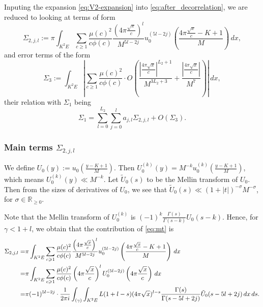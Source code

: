 \documentclass[reqno, 12pt]{amsart}
\renewcommand{\geq}{\geqslant}
\begin{document}
Inputing the expansion \eqref{eq:V2-expansion} into \eqref{eq:after_decorrelation}, we {are reduced to looking} at terms of form
\begin{equation}
\label{eq:mt}
\Sigma_{2,j,l} := \pi \int_{K^2E} \sum_{c \geq 1} \frac{\mu(c)^2}{c\phi(c)} \frac{\left(4\pi \frac{\sqrt{x}}{c} \right)^l}{M^{5l-2j}} u_0^{(5l-2j)} \left( \frac{4\pi \frac{\sqrt{x}}{c}-K+1}{M} \right) \,dx,
\end{equation}
and error terms of the form
\begin{equation}
\label{eq:et}
\Sigma_{3} := \int_{K^2E} \left| \sum_{c \geq 1} \frac{\mu(c)^2}{c\phi(c)} \cdot O \left( \frac{|\frac{4\pi \sqrt{x}}{c}|^{L_2+1}}{M^{3L_2+3}} + \frac{|\frac{4\pi \sqrt{x}}{c}|}{M^7} \right)  \right| \,dx,
\end{equation}
their relation with $\Sigma_1$ being
\[ \Sigma_1 = \sum_{l=0}^{L_2} \sum_{j=0}^l a_{j,l} \Sigma_{2,j,l} + O(\Sigma_3). \]


\subsubsection{Main terms {$\Sigma_{2,j,l}$}}

{W}e define $U_0(y) := u_0 \left( \frac{y-K+1}{M} \right)$. Then $U_0^{(k)}(y) = M^{-k} u_0^{(k)} \left( \frac{y-K+1}{M} \right)$, which means $U_0^{(k)}(y) \ll M^{-k}$.
Let $\tilde{U}_0(s)$ to be the Mellin transform of $U_0$. Then from the {sizes of derivatives of $U_0$}, we see that $\tilde{U}_0(s) \ll (1+|t|)^{-\sigma} M^{-\sigma}$, for $\sigma \in \mathbb{R}_{\geq 0}$.

Note that the Mellin transform of $U_0^{(k)}$ is $(-1)^{k} \frac{\Gamma(s)}{\Gamma(s-k)} U_0(s-k)$.
Hence, for $\gamma < 1+l$, we obtain that the contribution of \eqref{eq:mt} is
\begin{align}
 \Sigma_{2,j,l} = &\pi \int_{K^2E} \sum_{c \geq 1} \frac{\mu(c)^2}{c\phi(c)} \frac{\left(4\pi \frac{\sqrt{x}}{c} \right)^l}{M^{5l-2j}} u_0^{(5l-2j)} \left( \frac{4\pi \frac{\sqrt{x}}{c}-K+1}{M} \right) \,dx \notag \\
  =& \pi \int_{K^2E} \sum_{c \geq 1} \frac{\mu(c)^2}{c\phi(c)} \left(4\pi \frac{\sqrt{x}}{c} \right)^l  U_0^{(5l-2j)} \left( 4\pi \frac{\sqrt{x}}{c}\right) \,dx \notag \\
  =& \pi (-1)^{5l-2j} \cdot \frac{1}{2\pi i} \int_{(\gamma)} \int_{K^2 E} L(1+l-s) (4\pi \sqrt{x})^{l-s} \frac{\Gamma(s)}{\Gamma(s-5l+2j)} \tilde{U}_0(s-5l+2j) \,dx \,ds. \label{eq:moved-integral-mt}
\end{align}
\end{document}
